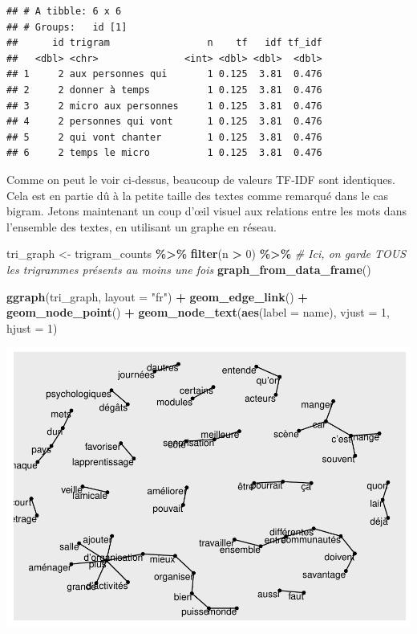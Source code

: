 \documentclass[
]{article}
\newenvironment{Shaded}{\begin{snugshade}}{\end{snugshade}}
\newcommand{\AttributeTok}[1]{\textcolor[rgb]{0.13,0.29,0.53}{#1}}
\newcommand{\CommentTok}[1]{\textcolor[rgb]{0.56,0.35,0.01}{\textit{#1}}}
\newcommand{\DecValTok}[1]{\textcolor[rgb]{0.00,0.00,0.81}{#1}}
\newcommand{\FunctionTok}[1]{\textcolor[rgb]{0.13,0.29,0.53}{\textbf{#1}}}
\newcommand{\NormalTok}[1]{#1}
\newcommand{\OtherTok}[1]{\textcolor[rgb]{0.56,0.35,0.01}{#1}}
\newcommand{\SpecialCharTok}[1]{\textcolor[rgb]{0.81,0.36,0.00}{\textbf{#1}}}
\newcommand{\StringTok}[1]{\textcolor[rgb]{0.31,0.60,0.02}{#1}}
\begin{document}
\begin{verbatim}
## # A tibble: 6 x 6
## # Groups:   id [1]
##      id trigram                 n    tf   idf tf_idf
##   <dbl> <chr>               <int> <dbl> <dbl>  <dbl>
## 1     2 aux personnes qui       1 0.125  3.81  0.476
## 2     2 donner à temps          1 0.125  3.81  0.476
## 3     2 micro aux personnes     1 0.125  3.81  0.476
## 4     2 personnes qui vont      1 0.125  3.81  0.476
## 5     2 qui vont chanter        1 0.125  3.81  0.476
## 6     2 temps le micro          1 0.125  3.81  0.476
\end{verbatim}

Comme on peut le voir ci-dessus, beaucoup de valeurs TF-IDF sont
identiques. Cela est en partie dû à la petite taille des textes comme
remarqué dans le cas bigram. Jetons maintenant un coup d'œil visuel aux
relations entre les mots dans l'ensemble des textes, en utilisant un
graphe en réseau.

\begin{Shaded}
\begin{Highlighting}[]
\NormalTok{tri\_graph }\OtherTok{\textless{}{-}}\NormalTok{ trigram\_counts }\SpecialCharTok{\%\textgreater{}\%}
  \FunctionTok{filter}\NormalTok{(n }\SpecialCharTok{\textgreater{}} \DecValTok{0}\NormalTok{) }\SpecialCharTok{\%\textgreater{}\%} \CommentTok{\# Ici, on garde TOUS les trigrammes présents au moins une fois}
  \FunctionTok{graph\_from\_data\_frame}\NormalTok{()}

\FunctionTok{ggraph}\NormalTok{(tri\_graph, }\AttributeTok{layout =} \StringTok{"fr"}\NormalTok{) }\SpecialCharTok{+}
  \FunctionTok{geom\_edge\_link}\NormalTok{() }\SpecialCharTok{+}
  \FunctionTok{geom\_node\_point}\NormalTok{() }\SpecialCharTok{+}
  \FunctionTok{geom\_node\_text}\NormalTok{(}\FunctionTok{aes}\NormalTok{(}\AttributeTok{label =}\NormalTok{ name), }\AttributeTok{vjust =} \DecValTok{1}\NormalTok{, }\AttributeTok{hjust =} \DecValTok{1}\NormalTok{)}
\end{Highlighting}
\end{Shaded}

\includegraphics{Texte_mining_files/figure-latex/unnamed-chunk-27-1.pdf}
\end{document}
